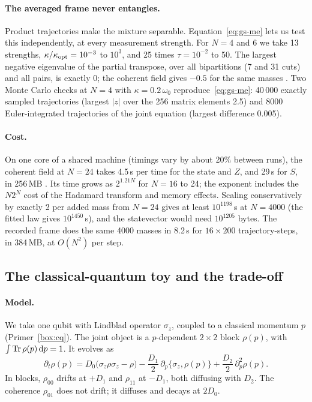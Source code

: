 \paragraph{The averaged frame never entangles.} Product trajectories make the mixture separable. Equation~\eqref{eq:gs-me} lets us test this
independently, at every measurement strength. For $N=4$ and 6 we take 13 strengths, $\kappa/\kappa_{\rm opt}=10^{-3}$ to $10^3$, and 25
times $\tau=10^{-2}$ to 50. The largest negative eigenvalue of the partial transpose, over all bipartitions (7 and 31 cuts) and all pairs, is
exactly 0; the coherent field gives $-0.5$ for the same masses . Two Monte Carlo checks at $N=4$ with $\kappa=0.2\,\omega_0$
reproduce~\eqref{eq:gs-me}: 40\,000 exactly sampled trajectories (largest $|z|$ over the 256 matrix elements 2.5) and 8000 Euler-integrated
trajectories of the joint equation (largest difference 0.005).

\paragraph{Cost.} On one core of a shared machine (timings vary by about 20\% between runs), the coherent field at $N=24$ takes 4.5\,s per
time for the state and $Z$, and 29\,s for $S$, in 256\,MB . Its time grows as $2^{1.21N}$ for $N=16$ to 24; the exponent
includes the $N2^N$ cost of the Hadamard transform and memory effects. Scaling conservatively by exactly 2 per added mass from $N=24$ gives at
least $10^{1198}$\,s at $N=4000$ (the fitted law gives $10^{1450}$\,s), and the statevector would need $10^{1205}$ bytes. The recorded frame
does the same 4000 masses in 8.2\,s for $16\times200$ trajectory-steps, in 384\,MB, at $O(N^2)$ per step.

\subsection{The classical-quantum toy and the trade-off}\label{ss:gs-cq}

\paragraph{Model.} We take one qubit with Lindblad operator $\sigma_z$, coupled to a classical momentum $p$ (Primer~\ref{box:cq}). The joint
object is a $p$-dependent $2\times2$ block $\rho(p)$, with $\int\operatorname{Tr}\rho(p)\,\mathrm{d} p=1$. It evolves as
\begin{equation}\label{eq:gs-cqme}
\partial_t\rho(p)=D_0\bigl(\sigma_z\rho\sigma_z-\rho\bigr)-\frac{D_1}{2}\,\partial_p\{\sigma_z,\rho(p)\}+\frac{D_2}{2}\,\partial_p^2\rho(p).
\end{equation}
In blocks, $\rho_{00}$ drifts at $+D_1$ and $\rho_{11}$ at $-D_1$, both diffusing with $D_2$. The coherence $\rho_{01}$ does not drift; it
diffuses and decays at $2D_0$.

